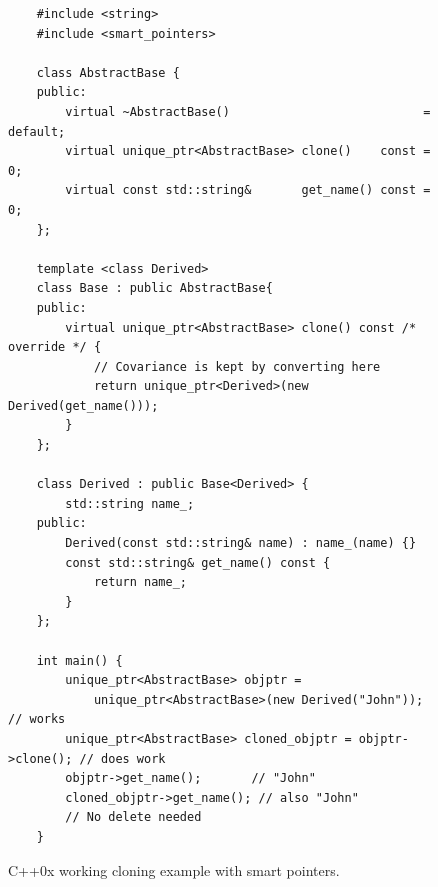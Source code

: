 \begin{figure}[tbh]
  \centering
  \begin{verbatim}
    #include <string>
    #include <smart_pointers>
    
    class AbstractBase {
    public:
        virtual ~AbstractBase()                           = default;
        virtual unique_ptr<AbstractBase> clone()    const = 0;
        virtual const std::string&       get_name() const = 0;
    };
    
    template <class Derived>
    class Base : public AbstractBase{
    public:
        virtual unique_ptr<AbstractBase> clone() const /* override */ {
            // Covariance is kept by converting here
            return unique_ptr<Derived>(new Derived(get_name()));
        }
    };
    
    class Derived : public Base<Derived> {
        std::string name_;
    public:
        Derived(const std::string& name) : name_(name) {}
        const std::string& get_name() const {
            return name_;
        }
    };
    
    int main() {
        unique_ptr<AbstractBase> objptr =
            unique_ptr<AbstractBase>(new Derived("John"));        // works
        unique_ptr<AbstractBase> cloned_objptr = objptr->clone(); // does work
        objptr->get_name();       // "John"
        cloned_objptr->get_name(); // also "John"
        // No delete needed
    }
  \end{verbatim}
  \caption{C++0x working cloning example with smart pointers.}
  \label{fig.gen.crtp.final}
\end{figure}

